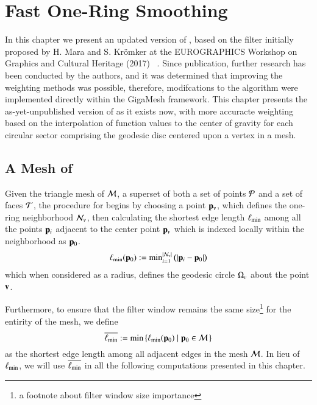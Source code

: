 \chapter{Fast One-Ring Smoothing}
\label{ch4}
In this chapter we present an updated version of , based on the filter initially proposed by H. Mara and S. Krömker at the EUROGRAPHICS Workshop on Graphics and Cultural Heritage (2017) ~\cite[s.~3.2]{Mara17}. Since publication, further research has been conducted by the authors, and it was determined that improving the weighting methods was possible, therefore, modifcations to the algorithm were implemented directly within the GigaMesh  framework. This chapter presents the as-yet-unpublished version of  as it exists now, with more accuracte weighting based on the interpolation of function values to the center of gravity for each circular sector comprising the geodesic disc centered upon a vertex in a mesh.

%
%
%
%
\section{A Mesh of \tdd{}}
\label{ch4sPE}
Given the triangle mesh of \tdd{} $\mathcal{M}$, a superset of both a set of points $\mathcal{P}$ and a set of faces $\mathcal{T}$, the procedure for   begins by choosing a point $\mathbf{p}_v$, which defines the one-ring neighborhood $\mathcal{N}_v$, then calculating the shortest edge length $\ell_\text{min}$ among all the points $\mathbf{p}_i$ adjacent to the center point $\mathbf{p}_v$ which  is indexed locally within the neighborhood as $\mathbf{p}_0$.
%
\begin{equation}
	\ell_\text{min}(\mathbf{p}_0) := \text{min}^{|\mathcal{N}_v|}_{i=1}\,\big(|\mathbf{p}_i - \mathbf{p}_0|\big)
	\label{eq:localMinimumEdgeLength}
\end{equation}%
%
%
%
which when considered as a radius, defines the geodesic circle $\Omega_v$ about the point $\mathbf{v}$.

Furthermore, to ensure that the filter window remains the same size\footnote{a footnote about filter window size importance} for the entirity of the mesh, we define
%
\begin{equation}
	\overline{\ell_\text{min}} := \min\left \{\ell_\text{min}(\mathbf{p}_0) \;|\; \mathbf{p}_0 \in \mathcal{M}\,\right \}
	\label{eq:globalMinimumEdgeLength}
\end{equation}%
%
%   
as the shortest edge length among all adjacent edges in the mesh $\mathcal{M}$. In lieu of $\ell_\text{min}$, we will use $\overline{\ell_\text{min}}$ in all the following computations presented in this chapter.

